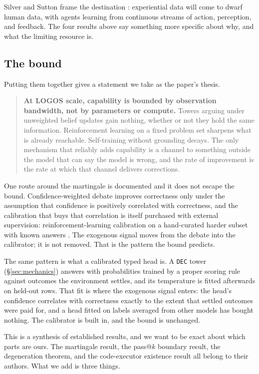 \documentclass[11pt]{article}
\begin{document}
Silver and Sutton frame the destination \cite{silver2025experience}: experiential data will come to dwarf human data, with agents learning from continuous streams of action, perception, and feedback. The four results above say something more specific about why, and what the limiting resource is.

\subsection{The bound}

Putting them together gives a statement we take as the paper's thesis.

\begin{quote}
\textbf{At LOGOS scale, capability is bounded by observation bandwidth, not by parameters or compute.} Towers arguing under unweighted belief updates gain nothing, whether or not they hold the same information. Reinforcement learning on a fixed problem set sharpens what is already reachable. Self-training without grounding decays. The only mechanism that reliably adds capability is a channel to something outside the model that can say the model is wrong, and the rate of improvement is the rate at which that channel delivers corrections.
\end{quote}

One route around the martingale is documented and it does not escape the bound. Con\-fi\-dence-weighted debate improves correctness only under the assumption that confidence is positively correlated with correctness, and the calibration that buys that correlation is itself purchased with external supervision: reinforcement-learning calibration on a hand-curated harder subset with known answers \cite{zhu2026debate}. The exogenous signal moves from the debate into the calibrator; it is not removed. That is the pattern the bound predicts.

The same pattern is what a calibrated typed head is. A \texttt{DEC} tower (\S\ref{sec:mechanics}) answers with probabilities trained by a proper scoring rule against outcomes the environment settles, and its temperature is fitted afterwards on held-out rows. That fit is where the exogenous signal enters: the head's confidence correlates with correctness exactly to the extent that settled outcomes were paid for, and a head fitted on labels averaged from other models has bought nothing. The calibrator is built in, and the bound is unchanged.

This is a synthesis of established results, and we want to be exact about which parts are ours. The martingale result, the pass@$k$ boundary result, the degeneration theorem, and the code-executor existence result all belong to their authors. What we add is three things.
\end{document}
